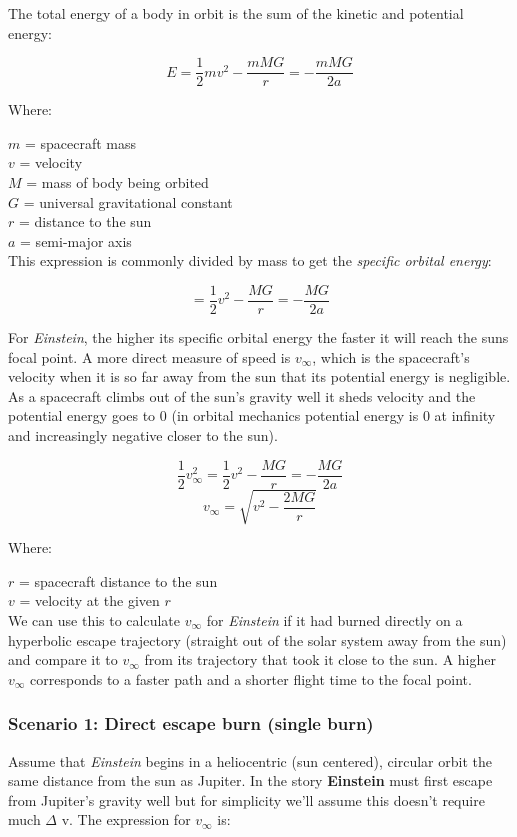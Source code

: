 \documentclass[12pt]{article} %
\begin{document}
The total energy of a body in orbit is the sum of the kinetic and potential energy:

$$ E = \frac{1}{2} mv^2 - \frac{mMG}{r} = -\frac{mMG}{2a}$$

Where:

$m$ = spacecraft mass \\
$v$ = velocity \\
$M$ = mass of body being orbited\\
$G$ = universal gravitational constant\\
$r$ = distance to the sun\\
$a$ = semi-major axis\\

This expression is commonly divided by mass to get the \textit{specific orbital energy}:

$$ = \frac{1}{2} v^2 - \frac{MG}{r} = -\frac{MG}{2a}$$

For \textit{Einstein}, the higher its specific orbital energy the faster it will reach the suns focal point. A more direct measure of speed is $v_{\infty}$, which is the spacecraft's velocity when it is so far away from the sun that its potential energy is negligible. As a spacecraft climbs out of the sun's gravity well it sheds velocity and the potential energy goes to 0 (in orbital mechanics potential energy is 0 at infinity and increasingly negative closer to the sun).

$$\frac{1}{2}v_{\infty}^{2} = \frac{1}{2} v^2 - \frac{MG}{r} = -\frac{MG}{2a}$$
$$v_{\infty} = \sqrt{v^2-\frac{2MG}{r}}$$

Where:

$r$ = spacecraft distance to the sun\\
$v$ = velocity at the given $r$\\

We can use this to calculate $v_{\infty}$ for \textit{Einstein} if it had burned directly on a hyperbolic escape trajectory (straight out of the solar system away from the sun) and compare it to $v_{\infty}$ from its trajectory that took it close to the sun. A higher $v_{\infty}$ corresponds to a faster path and a shorter flight time to the focal point.

\subsubsection{Scenario 1: Direct escape burn (single burn)}

Assume that \textit{Einstein} begins in a heliocentric (sun centered), circular orbit the same distance from the sun as Jupiter. In the story \textbf{Einstein} must first escape from Jupiter's gravity well but for simplicity we'll assume this doesn't require much $\Delta$ v. The expression for $v_{\infty}$ is:
\end{document}

